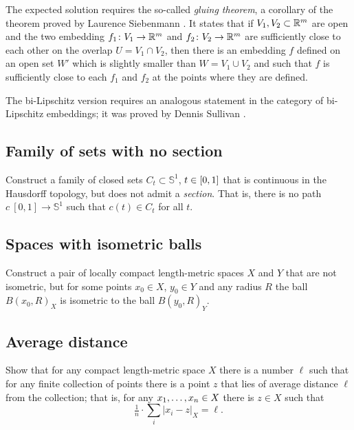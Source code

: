 The expected solution requires the so-called \emph{gluing theorem},
a corollary of the theorem proved by Laurence Siebenmann \cite{siebenmann}.
It states that 
if $V_1, V_2\subset\mathbb{R}^m$ are open
and the two embedding $f_1\colon V_1\to\mathbb{R}^m$ and $f_2\:V_2\z\to\RR^m$ 
are sufficiently close to each other 
on the overlap $U=V_1\cap V_2$, 
then
there is an embedding $f$ defined on an open set $W'$
which is slightly smaller than $W=V_1\cup V_2$
and such that $f$ is sufficiently close to each $f_1$ and $f_2$ at the points where they are defined.

The  bi-Lipschitz version requires 
an analogous statement in the category of bi-Lipschitz embeddings;
it was proved by
Dennis Sullivan \cite{sullivan}.

\subsection*{Family of sets with no section\easy}
\label{hausdorff-section} 

\begin{pr}
Construct a family of closed sets $C_t\subset\mathbb{S}^1$, $t\z\in [0,1]$ that is continuous in the Hausdorff topology, 
but does not admit a {}\emph{section}.
That is, there is no path $c\:[0,1]\to \mathbb{S}^1$ such that $c(t)\in C_t$ for all $t$.
\end{pr}

\subsection*{Spaces with isometric balls}

\begin{pr}
Construct a pair of locally compact length-metric spaces $X$ and $Y$ 
that are not isometric,
but for some points $x_0\in X$,  $y_0\in Y$ and any radius $R$
the ball $B(x_0,R)_X$ is 
isometric to the ball $B(y_0,R)_Y$.
\end{pr}

\subsection*{Average distance\easy}

\begin{pr}
Show that for any compact length-metric space $X$ there is a number $\ell$ such that for any finite collection of points there is a point $z$ that lies of average distance $\ell$ from the collection;
that is, for any $x_1,\dots,x_n\z\in X$ there is $z\in X$ such that
\[\tfrac1n\cdot\sum_i|x_i-z|_{X}=\ell.\]

\end{pr}



